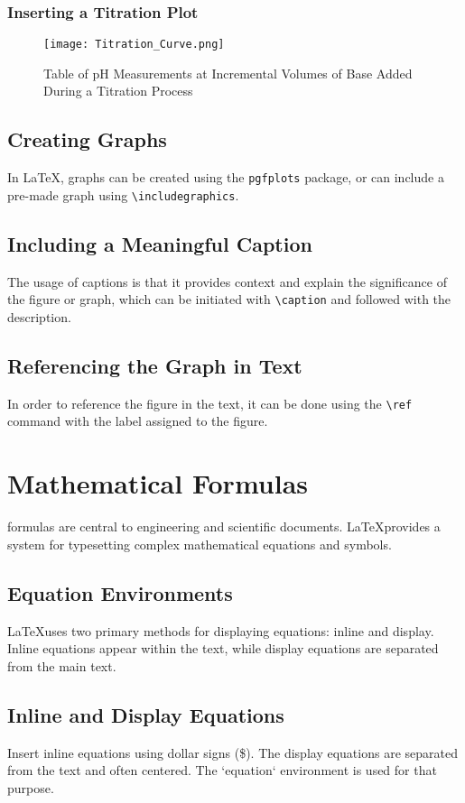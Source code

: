 \documentclass[12pt,journal,compsoc]{IEEEtran}
\begin{document}
\subsubsection{Inserting a Titration Plot}
\begin{figure}[htbp]
  \centering
  \texttt{[image: Titration\_Curve.png]}
  \caption{Table of pH Measurements at Incremental Volumes of Base Added During a Titration Process}
  \label{fig:titrationplot}
\end{figure}

\subsection{Creating Graphs}
In \LaTeX, graphs can be created using the \texttt{pgfplots} package, or can include a pre-made graph using \texttt{\textbackslash includegraphics}.

\subsection{Including a Meaningful Caption}
The usage of captions is that it provides context and explain the significance of the figure or graph, which can be initiated with \texttt{\textbackslash caption} and followed with the description.

\subsection{Referencing the Graph in Text}
In order to reference the figure in the text, it can be done using the \texttt{\textbackslash ref} command with the label assigned to the figure.

\section{Mathematical Formulas}
 formulas are central to engineering and scientific documents. \LaTeX provides a system for typesetting complex mathematical equations and symbols.  

\subsection{Equation Environments}
\LaTeX uses two primary methods for displaying equations: inline and display. Inline equations appear within the text, while display equations are separated from the main text.

\subsection{Inline and Display Equations}
Insert inline equations using dollar signs (\$). The display equations are separated from the text and often centered. The `equation` environment is used for that purpose.
\end{document}
